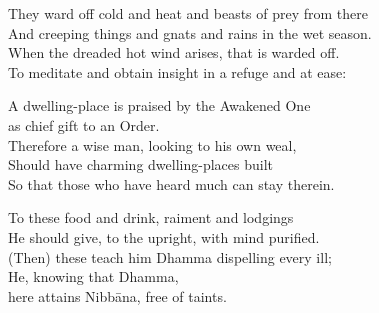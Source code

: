 \begin{english}
  \setlength{\parskip}{8pt}%
  They ward off cold and heat and beasts of prey from there\\
  And creeping things and gnats and rains in the wet season.\\
  When the dreaded hot wind arises, that is warded off.\\
  To meditate and obtain insight in a refuge and at ease:

  A dwelling-place is praised by the Awakened One\\
  \vin as chief gift to an Order.\\
  Therefore a wise man, looking to his own weal,\\
  Should have charming dwelling-places built\\
  So that those who have heard much can stay therein.

  To these food and drink, raiment and lodgings\\
  He should give, to the upright, with mind purified.\\
  (Then) these teach him Dhamma dispelling every ill;\\
  He, knowing that Dhamma,\\
  \vin here attains Nibbāna, free of taints.\\ 
\end{english}

%

